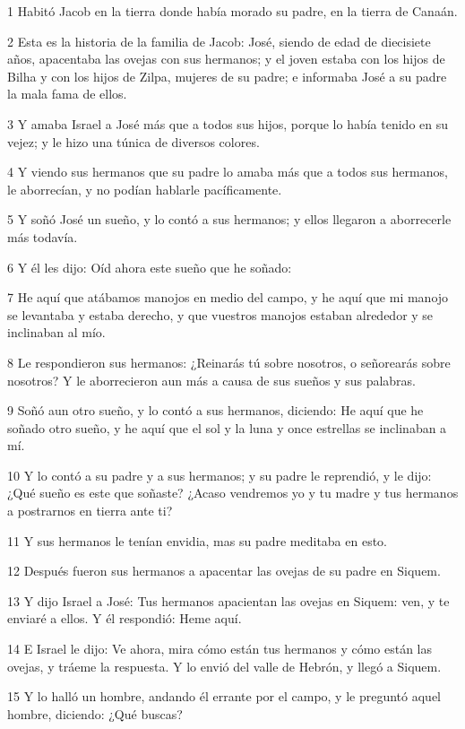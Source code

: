 \par 1 Habitó Jacob en la tierra donde había morado su padre, en la tierra de Canaán.
\par 2 Esta es la historia de la familia de Jacob: José, siendo de edad de diecisiete años, apacentaba las ovejas con sus hermanos; y el joven estaba con los hijos de Bilha y con los hijos de Zilpa, mujeres de su padre; e informaba José a su padre la mala fama de ellos.
\par 3 Y amaba Israel a José más que a todos sus hijos, porque lo había tenido en su vejez; y le hizo una túnica de diversos colores.
\par 4 Y viendo sus hermanos que su padre lo amaba más que a todos sus hermanos, le aborrecían, y no podían hablarle pacíficamente.
\par 5 Y soñó José un sueño, y lo contó a sus hermanos; y ellos llegaron a aborrecerle más todavía.
\par 6 Y él les dijo: Oíd ahora este sueño que he soñado:
\par 7 He aquí que atábamos manojos en medio del campo, y he aquí que mi manojo se levantaba y estaba derecho, y que vuestros manojos estaban alrededor y se inclinaban al mío.
\par 8 Le respondieron sus hermanos: ¿Reinarás tú sobre nosotros, o señorearás sobre nosotros? Y le aborrecieron aun más a causa de sus sueños y sus palabras.
\par 9 Soñó aun otro sueño, y lo contó a sus hermanos, diciendo: He aquí que he soñado otro sueño, y he aquí que el sol y la luna y once estrellas se inclinaban a mí.
\par 10 Y lo contó a su padre y a sus hermanos; y su padre le reprendió, y le dijo: ¿Qué sueño es este que soñaste? ¿Acaso vendremos yo y tu madre y tus hermanos a postrarnos en tierra ante ti?
\par 11 Y sus hermanos le tenían envidia, mas su padre meditaba en esto.
\par 12 Después fueron sus hermanos a apacentar las ovejas de su padre en Siquem.
\par 13 Y dijo Israel a José: Tus hermanos apacientan las ovejas en Siquem: ven, y te enviaré a ellos. Y él respondió: Heme aquí.
\par 14 E Israel le dijo: Ve ahora, mira cómo están tus hermanos y cómo están las ovejas, y tráeme la respuesta. Y lo envió del valle de Hebrón, y llegó a Siquem.
\par 15 Y lo halló un hombre, andando él errante por el campo, y le preguntó aquel hombre, diciendo: ¿Qué buscas?
